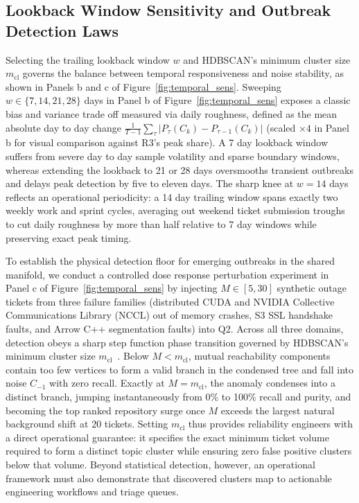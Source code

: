 \documentclass[sigconf,anonymous,pbalance]{acmart}
\begin{document}
\subsection{Lookback Window Sensitivity and Outbreak Detection Laws}
Selecting the trailing lookback window $w$ and HDBSCAN's minimum cluster size $m_{\text{cl}}$ governs the balance between temporal responsiveness and noise stability, as shown in Panels b and c of Figure~\ref{fig:temporal_sens}. Sweeping $w \in \{7, 14, 21, 28\}$ days in Panel b of Figure~\ref{fig:temporal_sens} exposes a classic bias and variance trade off measured via daily roughness, defined as the mean absolute day to day change $\frac{1}{T-1}\sum_{\tau} |P_\tau(C_k) - P_{\tau-1}(C_k)|$ (scaled $\times 4$ in Panel b for visual comparison against R3's peak share). A 7 day lookback window suffers from severe day to day sample volatility and sparse boundary windows, whereas extending the lookback to 21 or 28 days oversmooths transient outbreaks and delays peak detection by five to eleven days. The sharp knee at $w = 14$ days reflects an operational periodicity: a 14 day trailing window spans exactly two weekly work and sprint cycles, averaging out weekend ticket submission troughs to cut daily roughness by more than half relative to 7 day windows while preserving exact peak timing.

To establish the physical detection floor for emerging outbreaks in the shared manifold, we conduct a controlled dose response perturbation experiment in Panel c of Figure~\ref{fig:temporal_sens} by injecting $M \in [5, 30]$ synthetic outage tickets from three failure families (distributed CUDA and NVIDIA Collective Communications Library (NCCL) out of memory crashes, S3 SSL handshake faults, and Arrow C++ segmentation faults) into Q2. Across all three domains, detection obeys a sharp step function phase transition governed by HDBSCAN's minimum cluster size $m_{\text{cl}}$~\cite{campello2013density}. Below $M < m_{\text{cl}}$, mutual reachability components contain too few vertices to form a valid branch in the condensed tree and fall into noise $C_{-1}$ with zero recall. Exactly at $M = m_{\text{cl}}$, the anomaly condenses into a distinct branch, jumping instantaneously from 0\% to 100\% recall and purity, and becoming the top ranked repository surge once $M$ exceeds the largest natural background shift at 20 tickets. Setting $m_{\text{cl}}$ thus provides reliability engineers with a direct operational guarantee: it specifies the exact minimum ticket volume required to form a distinct topic cluster while ensuring zero false positive clusters below that volume. Beyond statistical detection, however, an operational framework must also demonstrate that discovered clusters map to actionable engineering workflows and triage queues.
\end{document}
